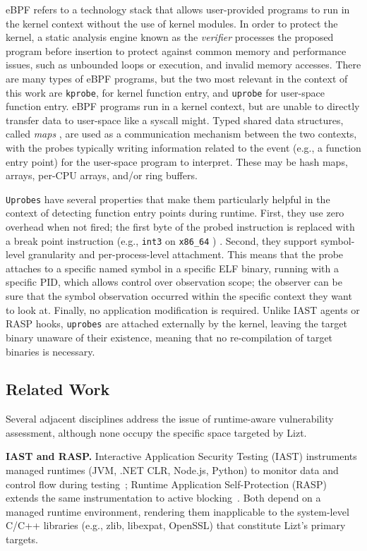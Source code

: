 \documentclass[conference]{IEEEtran}
\begin{document}
eBPF refers to a technology stack that allows user-provided programs to run in the kernel context without the use of kernel modules.
In order to protect the kernel, a static analysis engine known as the \textit{verifier} processes the proposed program before insertion to protect against common memory and performance issues, such as unbounded loops or execution, and invalid memory accesses.
There are many types of eBPF programs, but the two most relevant in the context of this work are \texttt{kprobe}, for kernel function entry, and \texttt{uprobe} for user-space function entry.
eBPF programs run in a kernel context, but are unable to directly transfer data to user-space like a syscall might.
Typed shared data structures, called \textit{maps} , are used as a communication mechanism between the two contexts, with the probes typically writing information related to the event (e.g., a function entry point) for the user-space program to interpret.
These may be hash maps, arrays, per-CPU arrays, and/or ring buffers.

\texttt{Uprobes} have several properties that make them particularly helpful in the context of detecting function entry points during runtime.
First, they use zero overhead when not fired; the first byte of the probed instruction is replaced with a break point instruction (e.g., \texttt{int3} on \texttt{x86\_64} ) \cite{kernel_kprobes} \cite{corbet_uprobes_2012}.
Second, they support symbol-level granularity and per-process-level attachment.
This means that the probe attaches to a specific named symbol in a specific ELF binary, running with a specific PID, which allows control over observation scope; the observer can be sure that the symbol observation occurred within the specific context they want to look at.
Finally, no application modification is required.
Unlike IAST agents or RASP hooks, \texttt{uprobes} are attached externally by the kernel, leaving the target binary unaware of their existence, meaning that no re-compilation of target binaries is necessary.

\subsection{Related Work}

Several adjacent disciplines address the issue of runtime-aware vulnerability assessment, although none occupy the specific space targeted by Lizt.

\textbf{IAST and RASP.} Interactive Application Security Testing (IAST) instruments managed runtimes (JVM, .NET CLR, Node.js, Python) to monitor data and control flow during testing~\cite{contrast_iast}; Runtime Application Self-Protection (RASP) extends the same instrumentation to active blocking~\cite{gartner_rasp}.
Both depend on a managed runtime environment, rendering them inapplicable to the system-level C/C++ libraries (e.g., zlib, libexpat, OpenSSL) that constitute Lizt's primary targets.
\end{document}
